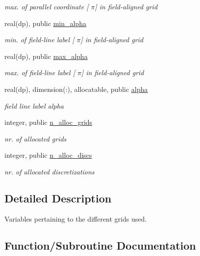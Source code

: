 \begin{DoxyCompactItemize}
\begin{DoxyCompactList}\small\item\em max. of parallel coordinate \mbox{[} $\pi$\mbox{]} in field-\/aligned grid \end{DoxyCompactList}\item 
real(dp), public \hyperlink{namespacegrid__vars_ad6f74227054278479670c68d8950e0e2}{min\+\_\+alpha}
\begin{DoxyCompactList}\small\item\em min. of field-\/line label \mbox{[} $\pi$\mbox{]} in field-\/aligned grid \end{DoxyCompactList}\item 
real(dp), public \hyperlink{namespacegrid__vars_ad3cab5cd1037b6956ccf74cde4539298}{max\+\_\+alpha}
\begin{DoxyCompactList}\small\item\em max. of field-\/line label \mbox{[} $\pi$\mbox{]} in field-\/aligned grid \end{DoxyCompactList}\item 
real(dp), dimension(\+:), allocatable, public \hyperlink{namespacegrid__vars_a07bf4730be1d5ab8b42f85be63e11797}{alpha}
\begin{DoxyCompactList}\small\item\em field line label alpha \end{DoxyCompactList}\item 
integer, public \hyperlink{namespacegrid__vars_ac4b43443d16af06fdc62d542b3eadee2}{n\+\_\+alloc\+\_\+grids}
\begin{DoxyCompactList}\small\item\em nr. of allocated grids \end{DoxyCompactList}\item 
integer, public \hyperlink{namespacegrid__vars_a23b5e4789dc5d3d0d6dadeb47909ddbd}{n\+\_\+alloc\+\_\+discs}
\begin{DoxyCompactList}\small\item\em nr. of allocated discretizations \end{DoxyCompactList}\end{DoxyCompactItemize}


\subsection{Detailed Description}
Variables pertaining to the different grids used. 

\subsection{Function/\+Subroutine Documentation}
\mbox{\label{namespacegrid__vars_a6fa9a9920f1a700d50075bc9c291a247}} 
